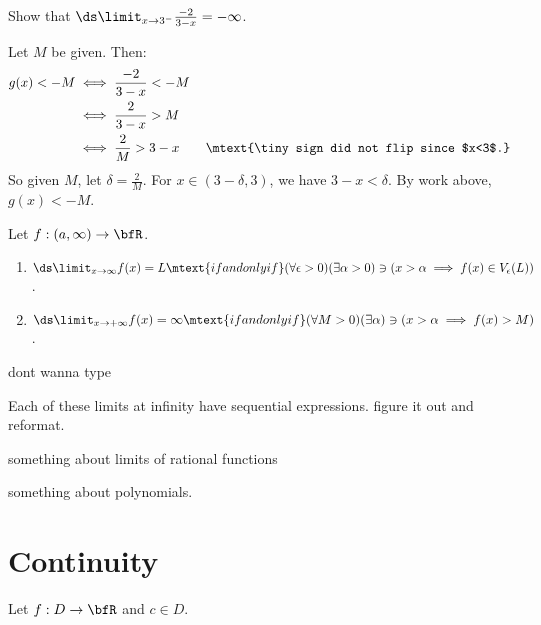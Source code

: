     \begin{example}
        Show that $\ds \limit_{x \rightarrow 3^{-}}\frac{-2}{3-x} = -\infty$.
    \end{example}
        \begin{solution}
            Let $M$ be given. Then:
                \begin{equation*}
                \begin{split}
                    g(x) < -M 
                    &\iff \frac{-2}{3-x} < -M \\
                    &\iff \frac{2}{3-x} > M \\
                    &\iff \frac{2}{M} > 3-x \quad\quad{\mtext{\tiny sign did not flip since $x<3$.}}
                \end{split}
                \end{equation*}
            So given $M$, let $\delta  = \frac{2}{M}$. For $x \in (3 - \delta,3)$, we have $3-x < \delta$. By work above, $g(x) < -M$.
        \end{solution}

    \begin{definition}
        Let $f:(a,\infty) \rightarrow \bfR$.
        \begin{enumerate}[label = (\arabic*)]
            \item $\ds \limit_{x \rightarrow \infty}f(x) = L \mtext{if and only if} (\forall \epsilon > 0)(\exists \alpha > 0) \ni (x > \alpha \implies f(x) \in V_\epsilon(L))$.
            \item $\ds \limit_{x \rightarrow +\infty}f(x) = \infty \mtext{if and only if} (\forall M>0)(\exists \alpha) \ni (x > \alpha \implies f(x) > M)$.
        \end{enumerate}
    \end{definition}

    \begin{example}
        {\color{red}dont wanna type}
    \end{example}

    \begin{remark}
        Each of these limits at infinity have sequential expressions. {\color{red} figure it out and reformat.}
    \end{remark}

    \begin{proposition}
        {\color{red} something about limits of rational functions}
    \end{proposition}

    \begin{corollary}
        {\color{red} something about polynomials.}
    \end{corollary}

\section{Continuity}
    \begin{definition}
        Let $f:D \rightarrow \bfR$ and $c \in D$.
    \end{definition}


